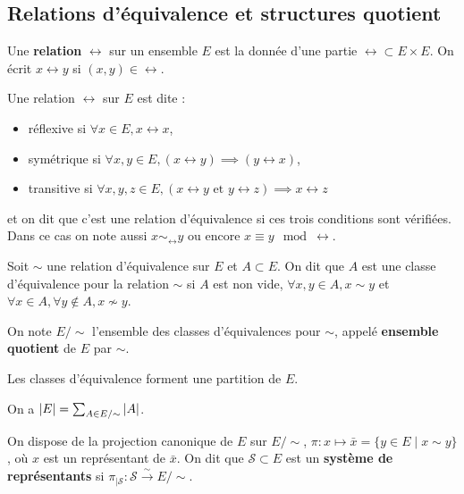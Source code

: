 \subsection{Relations d'équivalence et structures quotient}

	\begin{defn}
		Une \textbf{relation} $\rel$ sur un ensemble $E$ est la donnée d'une partie $\rel \subset E \times E$.
		On écrit $x \rel y$ si $(x,y) \in \rel$.
	\end{defn}

	\begin{defn}
		Une relation $\rel$ sur $E$ est dite :
		\begin{itemize}
			\item[\textbullet] réflexive si $\forall x \in E, x \rel x$,
			\item[\textbullet] symétrique si $\forall x, y \in E, \left( x \rel y \right) \implies \left( y \rel x \right)$,
			\item[\textbullet] transitive si $\forall x, y, z \in E, \left( x \rel y \text{ et } y \rel z \right) \implies x \rel z$
		\end{itemize}
		et on dit que c'est une relation d'équivalence si ces trois conditions sont vérifiées.
		Dans ce cas on note aussi $x \sim_\rel y$ ou encore $x \equiv y \mod \rel$.
	\end{defn}
	
	\begin{defn}
	Soit $\sim$ une relation d'équivalence sur $E$ et $A \subset E$.
	On dit que $A$ est une classe d'équivalence pour la relation $\sim$ si $A$ est non vide, $\forall x,y \in A, x \sim y$ et $\forall x \in A, \forall y \not\in A, x \not\sim y$.
	\end{defn}

	\begin{note}
		On note $E / \sim$ l'ensemble des classes d'équivalences pour $\sim$, appelé \textbf{ensemble quotient} de $E$ par $\sim$.
	\end{note}

	\begin{pop}
		Les classes d'équivalence forment une partition de $E$.
	\end{pop}

	\begin{cor}
		On a $\left\lvert E\right\rvert = \sum_{A \in E/\sim} \left\lvert A\right\rvert$.
	\end{cor}

	On dispose de la projection canonique de $E$ sur $E/\sim$, $\pi \colon x \mapsto \bar{x} = \{ y \in E \mid x \sim y \}$, où $x$ est un représentant de $\bar{x}$.
	On dit que $\mathcal{S} \subset E$ est un \textbf{système de représentants} si $\pi_{|\mathcal{S}} \colon \mathcal{S} \overset{\sim}{\to} E/\sim$.

